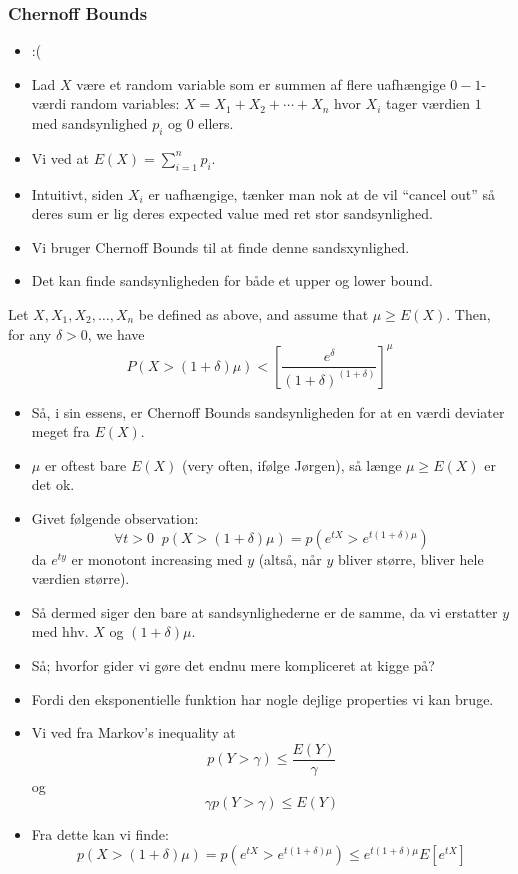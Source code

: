 \documentclass{beamer}
\begin{document}
\begin{frame}[allowframebreaks]
  \frametitle{Chernoff Bounds}
  \begin{itemize}
  \item :(
  \item Lad $X$ være et random variable som er summen af flere uafhængige $0-1$-værdi random variables: $X = X_{1} + X_{2} + \cdots + X_{n}$ hvor $X_{i}$ tager værdien $1$ med sandsynlighed $p_{i}$ og 0 ellers. 
  \item Vi ved at $E(X) = \sum_{i=1}^{n}p_{i}$. 
  \item Intuitivt, siden $X_{i}$ er uafhængige, tænker man nok at de vil ``cancel out'' så deres sum er lig deres expected value med ret stor sandsynlighed. 
  \item Vi bruger Chernoff Bounds til at finde denne sandsxynlighed.
  \item Det kan finde sandsynligheden for både et upper og lower bound. 
  \end{itemize}
\begin{theorem}
  Let $X, X_{1}, X_{2}, \ldots, X_{n}$ be defined as above, and assume that $\mu \geq E(X)$. Then, for any $\delta > 0$, we have
  \[P(X > (1+\delta)\mu) < \left[ \frac{e^{\delta}}{(1+\delta)^{(1+\delta)}} \right]^{\mu}\]
\end{theorem}
\begin{itemize}
\item Så, i sin essens, er Chernoff Bounds sandsynligheden for at en værdi deviater meget fra $E(X)$.
\item $\mu$ er oftest bare $E(X)$ (very often, ifølge Jørgen), så længe $\mu \geq E(X)$ er det ok.
\item Givet følgende observation: \[ \forall t > 0 \; \; p(X > (1 + \delta) \mu) = p(e^{tX} > e^{t(1+\delta)\mu}) \] da $e^{ty}$ er monotont increasing med $y$ (altså, når $y$ bliver større, bliver hele værdien større).
\item Så dermed siger den bare at sandsynlighederne er de samme, da vi erstatter $y$ med hhv. $X$ og $(1 + \delta) \mu$.
\item Så; hvorfor gider vi gøre det endnu mere kompliceret at kigge på? 
\item Fordi den eksponentielle funktion har nogle dejlige properties vi kan bruge.
\item Vi ved fra Markov's inequality at \[ p(Y > \gamma) \leq \frac{E(Y)}{\gamma} \] og \[ \gamma p(Y > \gamma) \leq E(Y) \]
\item Fra dette kan vi finde: \[ p(X > (1+ \delta) \mu) = p(e ^{tX} > e^{t(1+ \delta) \mu}) \leq e^{t(1+ \delta) \mu} E[e^{tX}] \]

\end{itemize}
\end{frame}
\end{document}
